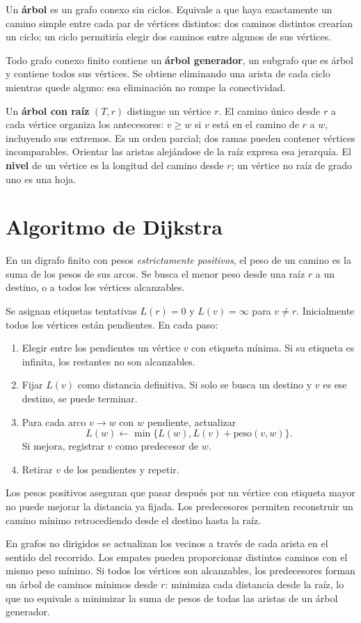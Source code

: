 Un \textbf{árbol} es un grafo conexo sin ciclos.
Equivale a que haya exactamente un camino simple entre cada par
de vértices distintos: dos caminos distintos crearían un ciclo;
un ciclo permitiría elegir dos caminos entre algunos de sus vértices.

Todo grafo conexo finito contiene un \textbf{árbol generador}, un
subgrafo que es árbol y contiene todos sus vértices.
Se obtiene eliminando una arista de cada ciclo mientras quede alguno:
esa eliminación no rompe la conectividad.

Un \textbf{árbol con raíz} $(T,r)$ distingue un vértice $r$.
El camino único desde $r$ a cada vértice organiza los antecesores:
$v\ge w$ si $v$ está en el camino de $r$ a $w$, incluyendo sus extremos.
Es un orden parcial; dos ramas pueden contener vértices incomparables.
Orientar las aristas alejándose de la raíz expresa esa jerarquía.
El \textbf{nivel} de un vértice es la longitud del camino desde $r$;
un vértice no raíz de grado uno es una hoja.

\section{Algoritmo de Dijkstra}
\label{md:dijkstra}

En un digrafo finito con pesos \emph{estrictamente positivos}, el peso
de un camino es la suma de los pesos de sus arcos. Se busca el menor
peso desde una raíz $r$ a un destino, o a todos los vértices alcanzables.

Se asignan etiquetas tentativas $L(r)=0$ y $L(v)=\infty$ para $v\ne r$.
Inicialmente todos los vértices están pendientes. En cada paso:
\begin{enumerate}
 \item Elegir entre los pendientes un vértice $v$ con etiqueta mínima.
       Si su etiqueta es infinita, los restantes no son alcanzables.
 \item Fijar $L(v)$ como distancia definitiva. Si solo se busca un destino
       y $v$ es ese destino, se puede terminar.
 \item Para cada arco $v\to w$ con $w$ pendiente, actualizar
       \[
        L(w)\leftarrow\min\{L(w),L(v)+\text{peso}(v,w)\}.
       \]
       Si mejora, registrar $v$ como predecesor de $w$.
 \item Retirar $v$ de los pendientes y repetir.
\end{enumerate}
Los pesos positivos aseguran que pasar después por un vértice con
etiqueta mayor no puede mejorar la distancia ya fijada.
Los predecesores permiten reconstruir un camino mínimo retrocediendo
desde el destino hasta la raíz.

En grafos no dirigidos se actualizan los vecinos a través de cada
arista en el sentido del recorrido. Los empates pueden proporcionar
distintos caminos con el mismo peso mínimo.
Si todos los vértices son alcanzables, los predecesores forman un árbol
de caminos mínimos desde $r$: minimiza cada distancia desde la raíz,
lo que no equivale a minimizar la suma de pesos de todas las aristas
de un árbol generador.
